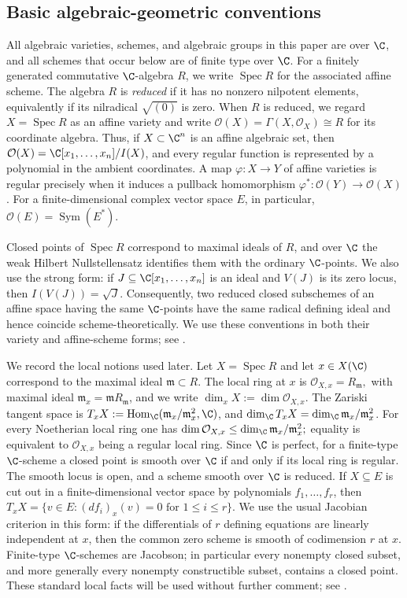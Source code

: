 \documentclass[12pt,leqno]{amsart}
\numberwithin{equation}{section} \newtheorem{thm}{Theorem}[section] \newtheorem{lem}[thm]{Lemma} \newtheorem{ex}[thm]{Example} \newtheorem{prop}[thm]{Proposition} \newtheorem{cor}[thm]{Corollary} \newtheorem{defi}[thm]{Definition} \newtheorem{rmk}[thm]{Remark} \newtheorem{notation}[thm]{Notation}
\newcommand{\Sym}{\operatorname{Sym}}
\newcommand{\Spec}{\operatorname{Spec}}
\newcommand{\Hom}{\operatorname{Hom}}
\newcommand{\OO}{\mathcal O}
\begin{document}
\subsection{Basic algebraic-geometric conventions}
\label{subsec:AG-conventions}

All algebraic varieties, schemes, and algebraic groups in this paper are over $\C$, and all schemes that occur below are of finite type over $\C$. For a finitely generated commutative $\C$-algebra $R$, we write $\Spec R$ for the associated affine scheme. The algebra $R$ is \emph{reduced} if it has no nonzero nilpotent elements, equivalently if its nilradical $\sqrt{(0)}$ is zero. When $R$ is reduced, we regard $X=\Spec R$ as an affine variety and write $\OO(X)=\Gamma(X,\mathcal O_X)\cong R$ for its coordinate algebra. Thus, if $X\subset\C^n$ is an affine algebraic set, then $\OO(X)=\C[x_1,\ldots,x_n]/I(X)$, and every regular function is represented by a polynomial in the ambient coordinates. A map $\varphi:X\to Y$ of affine varieties is regular precisely when it induces a pullback homomorphism $\varphi^*:\OO(Y)\to\OO(X)$. For a finite-dimensional complex vector space $E$, in particular, $\OO(E)=\Sym(E^*)$.

Closed points of $\Spec R$ correspond to maximal ideals of $R$, and over $\C$ the weak Hilbert Nullstellensatz identifies them with the ordinary $\C$-points. We also use the strong form: if $J\subseteq\C[x_1,\ldots,x_n]$ is an ideal and $V(J)$ is its zero locus, then \(I(V(J))=\sqrt J.\) Consequently, two reduced closed subschemes of an affine space having the same $\C$-points have the same radical defining ideal and hence coincide scheme-theoretically. We use these conventions in both their variety and affine-scheme forms; see \cite[Chapters~I--II]{Hartshorne}.

We record the local notions used later. Let $X=\Spec R$ and let $x\in X(\C)$ correspond to the maximal ideal $\mathfrak m\subset R$. The local ring at $x$ is \(\mathcal O_{X,x}=R_{\mathfrak m},\) with maximal ideal $\mathfrak m_x=\mathfrak mR_{\mathfrak m}$, and we write \(\dim_xX:=\dim\mathcal O_{X,x}.\) The Zariski tangent space is \(T_xX:=\Hom_\C(\mathfrak m_x/\mathfrak m_x^2,\C)\), and \(\dim_\C T_xX=\dim_\C\mathfrak m_x/\mathfrak m_x^2\). For every Noetherian local ring one has \(\dim\mathcal O_{X,x}\leq\dim_\C\mathfrak m_x/\mathfrak m_x^2;\) equality is equivalent to $\mathcal O_{X,x}$ being a regular local ring. Since $\C$ is perfect, for a finite-type $\C$-scheme a closed point is smooth over $\C$ if and only if its local ring is regular. The smooth locus is open, and a scheme smooth over $\C$ is reduced. If $X\subseteq E$ is cut out in a finite-dimensional vector space by polynomials $f_1,\ldots,f_r$, then \(T_xX=\{v\in E:(df_i)_x(v)=0\text{ for }1\leq i\leq r\}.\) We use the usual Jacobian criterion in this form: if the differentials of $r$ defining equations are linearly independent at $x$, then the common zero scheme is smooth of codimension $r$ at $x$. Finite-type $\C$-schemes are Jacobson; in particular every nonempty closed subset, and more generally every nonempty constructible subset, contains a closed point. These standard local facts will be used without further comment; see \cite[Chapter~I, \S5 and Chapter~III, \S10]{Hartshorne}.
\end{document}
